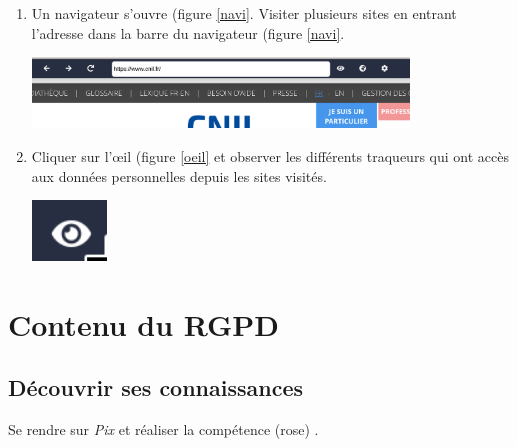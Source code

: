 \documentclass[a4paper,11pt]{article}
\begin{document}
\begin{Form}
\begin{activite}
\begin{enumerate}
\item Un navigateur s'ouvre (figure \ref{navi}. Visiter plusieurs sites en entrant l'adresse dans la barre du navigateur (figure \ref{navi}.
\begin{center}
\centering
\includegraphics[width=10cm]{ressources/cookieviz.png}
\label{navi}
\end{center}
\item Cliquer sur l'œil (figure \ref{oeil} et observer les différents traqueurs qui ont accès aux données personnelles depuis les sites visités.
\begin{center}
\centering
\includegraphics[width=2cm]{ressources/oeil.png}
\label{oeil}
\end{center}
\end{enumerate}
\end{activite}
\section{Contenu du RGPD}
\subsection{Découvrir ses connaissances}
\begin{activite}
Se rendre sur \emph{Pix} et réaliser la compétence (rose) .
\end{activite}

\end{Form}
\end{document}
